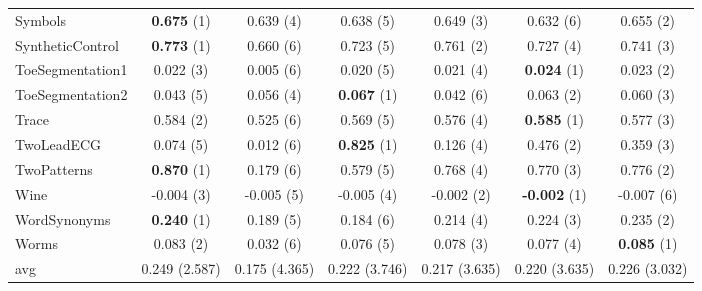 \begin{table}[ht]
\begin{adjustbox}{width=\textwidth}
\begin{tabular}{lcccccc}
    Symbols & \textbf{0.675} (1) & 0.639 (4) & 0.638 (5) & 0.649 (3) & 0.632 (6) & 0.655 (2) \\
    SyntheticControl & \textbf{0.773} (1) & 0.660 (6) & 0.723 (5) & 0.761 (2) & 0.727 (4) & 0.741 (3) \\
    ToeSegmentation1 & 0.022 (3) & 0.005 (6) & 0.020 (5) & 0.021 (4) & \textbf{0.024} (1) & 0.023 (2) \\
    ToeSegmentation2 & 0.043 (5) & 0.056 (4) & \textbf{0.067} (1) & 0.042 (6) & 0.063 (2) & 0.060 (3) \\
    Trace & 0.584 (2) & 0.525 (6) & 0.569 (5) & 0.576 (4) & \textbf{0.585} (1) & 0.577 (3) \\
    TwoLeadECG & 0.074 (5) & 0.012 (6) & \textbf{0.825} (1) & 0.126 (4) & 0.476 (2) & 0.359 (3) \\
    TwoPatterns & \textbf{0.870} (1) & 0.179 (6) & 0.579 (5) & 0.768 (4) & 0.770 (3) & 0.776 (2) \\
    Wine & -0.004 (3) & -0.005 (5) & -0.005 (4) & -0.002 (2) & \textbf{-0.002} (1) & -0.007 (6) \\
    WordSynonyms & \textbf{0.240} (1) & 0.189 (5) & 0.184 (6) & 0.214 (4) & 0.224 (3) & 0.235 (2) \\
    Worms & 0.083 (2) & 0.032 (6) & 0.076 (5) & 0.078 (3) & 0.077 (4) & \textbf{0.085} (1) \\
    \hline 
    avg & 0.249 (2.587) & 0.175 (4.365) & 0.222 (3.746) & 0.217 (3.635) & 0.220 (3.635) & 0.226 (3.032) \\ 
    \hline
    \end{tabular}
    \end{adjustbox}
    \end{table}


